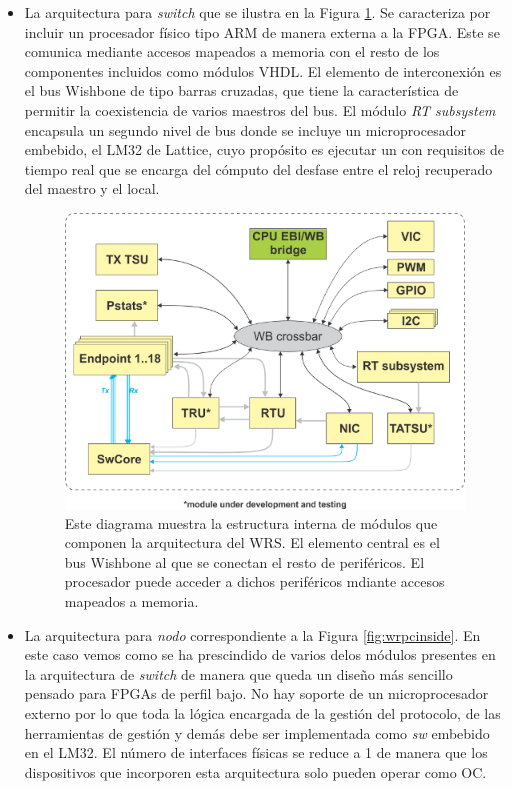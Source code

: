 \begin{itemize}
	\item La arquitectura para \textit{switch} que se ilustra en la Figura 
	\ref{fig:switchhdl}. Se caracteriza por incluir un procesador físico tipo 
	ARM de manera externa a la FPGA. Este se comunica mediante accesos mapeados 
	a memoria con el resto de los componentes incluidos como módulos VHDL. El 
	elemento de interconexión es el bus Wishbone de tipo barras cruzadas, que 
	tiene la característica de permitir la coexistencia de varios maestros del 
	bus. El módulo \textit{RT subsystem} encapsula un segundo nivel de bus 
	donde se incluye un microprocesador embebido, el LM32 de Lattice, cuyo 
	propósito es ejecutar un  con requisitos de tiempo real que se 
	encarga del cómputo del desfase entre el reloj recuperado del maestro y el 
	local.
	
	\begin{figure}
		\centering
		\includegraphics[width=\linewidth]{imagenes/switch_hdl}
		\caption[Diagrama de los componentes de la arquitectura del WRS]{Este 
		diagrama muestra la estructura interna de módulos que componen la 
		arquitectura del WRS. El elemento central es el bus Wishbone al que se 
		conectan el resto de periféricos. El procesador puede acceder a dichos 
		periféricos mdiante accesos mapeados a memoria.}
		\label{fig:switchhdl}
	\end{figure}
	
	\item La arquitectura para \textit{nodo} correspondiente a la Figura 
	\ref{fig:wrpcinside}. En este caso vemos como se ha prescindido de varios 
	delos módulos presentes en la arquitectura de \textit{switch} de manera que 
	queda un diseño más sencillo pensado para FPGAs de perfil bajo. No hay 
	soporte de un microprocesador externo por lo que toda la lógica encargada 
	de la gestión del protocolo, de las herramientas de gestión y demás debe 
	ser implementada como \textit{sw} embebido en el LM32. El número de 
	interfaces físicas se reduce a 1 de manera que los dispositivos que 
	incorporen esta arquitectura solo pueden operar como OC.
\end{itemize}

